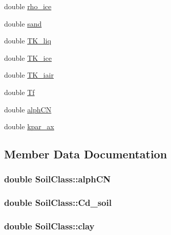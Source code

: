 \begin{DoxyCompactItemize}
double \hyperlink{class_soil_class_a8666a05156e531263ceb8deafdf6be64}{rho\+\_\+ice}
\item 
double \hyperlink{class_soil_class_aa77701215a7affea1d917a9011b3b11b}{sand}
\item 
double \hyperlink{class_soil_class_a4d89a6cb717b11f45a9e6c8b5390d160}{T\+K\+\_\+liq}
\item 
double \hyperlink{class_soil_class_ae6d499271031f749a8c150b3c2e1b5ab}{T\+K\+\_\+ice}
\item 
double \hyperlink{class_soil_class_a83df8658b0c0df333185201ec6bc14c4}{T\+K\+\_\+iair}
\item 
double \hyperlink{class_soil_class_a87514e9ae1b4b8f8a08e45fb19f9e374}{Tf}
\item 
double \hyperlink{class_soil_class_aa1373fdc2c24d7b3007e319286d919ae}{alph\+CN}
\item 
double \hyperlink{class_soil_class_aba68b41e811464773195b40d6e9ed780}{kpar\+\_\+ax}
\end{DoxyCompactItemize}


\subsection{Member Data Documentation}
\subsubsection[{\texorpdfstring{alph\+CN}{alphCN}}]{\setlength{\rightskip}{0pt plus 5cm}double Soil\+Class\+::alph\+CN}\hypertarget{class_soil_class_aa1373fdc2c24d7b3007e319286d919ae}{}\label{class_soil_class_aa1373fdc2c24d7b3007e319286d919ae}
\subsubsection[{\texorpdfstring{Cd\+\_\+soil}{Cd_soil}}]{\setlength{\rightskip}{0pt plus 5cm}double Soil\+Class\+::\+Cd\+\_\+soil}\hypertarget{class_soil_class_a0e505985e7418389cb1aa1aa4d6901a7}{}\label{class_soil_class_a0e505985e7418389cb1aa1aa4d6901a7}
\subsubsection[{\texorpdfstring{clay}{clay}}]{\setlength{\rightskip}{0pt plus 5cm}double Soil\+Class\+::clay}\hypertarget{class_soil_class_a7d46c0a4c4879d4a3537c0bdbea68d1f}{}\label{class_soil_class_a7d46c0a4c4879d4a3537c0bdbea68d1f}
